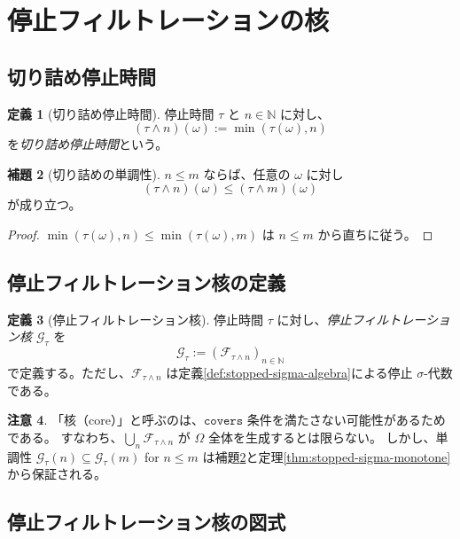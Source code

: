 \documentclass[11pt,a4paper,ja=standard]{ltjsarticle}
\theoremstyle{definition}
\newtheorem{definition}{定義}[section]
\newtheorem{lemma}[definition]{補題}
\newtheorem{remark}[definition]{注意}
\newcommand{\N}{\mathbb{N}}
\newcommand{\F}{\mathcal{F}}
\newcommand{\G}{\mathcal{G}}
\begin{document}
\section{停止フィルトレーションの核}

\subsection{切り詰め停止時間}

\begin{definition}[切り詰め停止時間]\label{def:truncate-stopping-time}
停止時間 $\tau$ と $n \in \N$ に対し、
\[
(\tau \wedge n)(\omega) := \min(\tau(\omega), n)
\]
を\emph{切り詰め停止時間}という。
\end{definition}

\begin{lemma}[切り詰めの単調性]\label{lem:truncate-monotone}
$n \le m$ ならば、任意の $\omega$ に対し
\[
(\tau \wedge n)(\omega) \le (\tau \wedge m)(\omega)
\]
が成り立つ。
\end{lemma}

\begin{proof}
$\min(\tau(\omega), n) \le \min(\tau(\omega), m)$ は $n \le m$ から直ちに従う。
\end{proof}

\subsection{停止フィルトレーション核の定義}

\begin{definition}[停止フィルトレーション核]\label{def:stopped-filtration-core}
停止時間 $\tau$ に対し、\emph{停止フィルトレーション核 $\G_\tau$} を
\[
\G_\tau := (\F_{\tau \wedge n})_{n \in \N}
\]
で定義する。ただし、$\F_{\tau \wedge n}$ は定義\ref{def:stopped-sigma-algebra}による停止 $\sigma$-代数である。
\end{definition}

\begin{remark}
「核（core）」と呼ぶのは、$\mathtt{covers}$ 条件を満たさない可能性があるためである。
すなわち、$\bigcup_n \F_{\tau \wedge n}$ が $\Omega$ 全体を生成するとは限らない。
しかし、単調性 $\G_\tau(n) \subseteq \G_\tau(m)$ for $n \le m$ は補題\ref{lem:truncate-monotone}と定理\ref{thm:stopped-sigma-monotone}から保証される。
\end{remark}

\subsection{停止フィルトレーション核の図式}
\end{document}
